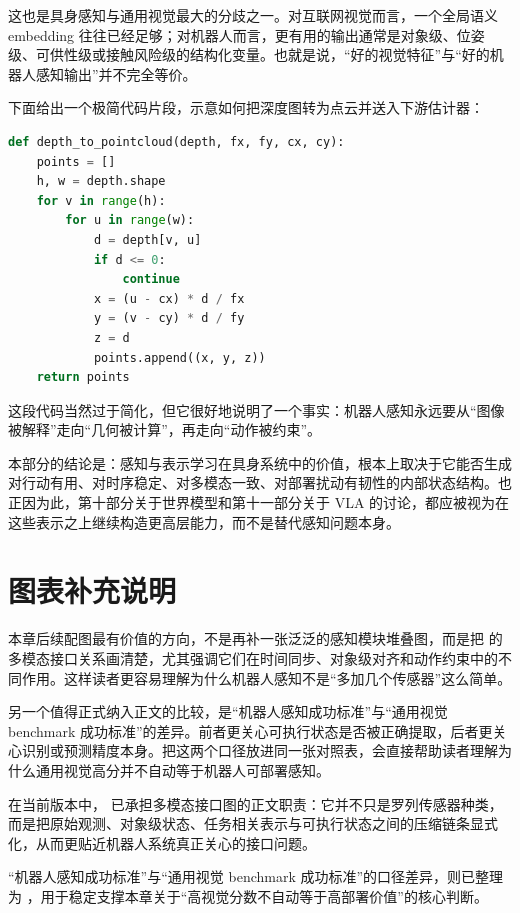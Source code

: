 这也是具身感知与通用视觉最大的分歧之一。对互联网视觉而言，一个全局语义 embedding 往往已经足够；对机器人而言，更有用的输出通常是对象级、位姿级、可供性级或接触风险级的结构化变量。也就是说，“好的视觉特征”与“好的机器人感知输出”并不完全等价。

下面给出一个极简代码片段，示意如何把深度图转为点云并送入下游估计器：

\begin{lstlisting}[language=python]
def depth_to_pointcloud(depth, fx, fy, cx, cy):
    points = []
    h, w = depth.shape
    for v in range(h):
        for u in range(w):
            d = depth[v, u]
            if d <= 0:
                continue
            x = (u - cx) * d / fx
            y = (v - cy) * d / fy
            z = d
            points.append((x, y, z))
    return points
\end{lstlisting}

这段代码当然过于简化，但它很好地说明了一个事实：机器人感知永远要从“图像被解释”走向“几何被计算”，再走向“动作被约束”。

本部分的结论是：感知与表示学习在具身系统中的价值，根本上取决于它能否生成对行动有用、对时序稳定、对多模态一致、对部署扰动有韧性的内部状态结构。也正因为此，第十部分关于世界模型和第十一部分关于 VLA 的讨论，都应被视为在这些表示之上继续构造更高层能力，而不是替代感知问题本身。

\section*{图表补充说明}

本章后续配图最有价值的方向，不是再补一张泛泛的感知模块堆叠图，而是把  的多模态接口关系画清楚，尤其强调它们在时间同步、对象级对齐和动作约束中的不同作用。这样读者更容易理解为什么机器人感知不是“多加几个传感器”这么简单。

另一个值得正式纳入正文的比较，是“机器人感知成功标准”与“通用视觉 benchmark 成功标准”的差异。前者更关心可执行状态是否被正确提取，后者更关心识别或预测精度本身。把这两个口径放进同一张对照表，会直接帮助读者理解为什么通用视觉高分并不自动等于机器人可部署感知。

在当前版本中，\texttt{} 已承担多模态接口图的正文职责：它并不只是罗列传感器种类，而是把原始观测、对象级状态、任务相关表示与可执行状态之间的压缩链条显式化，从而更贴近机器人系统真正关心的接口问题。

“机器人感知成功标准”与“通用视觉 benchmark 成功标准”的口径差异，则已整理为 \texttt{}，用于稳定支撑本章关于“高视觉分数不自动等于高部署价值”的核心判断。

